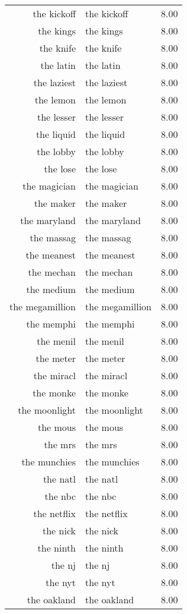 \begin{table}[ht]
\begin{tabular}{rlr}
  the kickoff & the kickoff & 8.00 \\ 
  the kings & the kings & 8.00 \\ 
  the knife & the knife & 8.00 \\ 
  the latin & the latin & 8.00 \\ 
  the laziest & the laziest & 8.00 \\ 
  the lemon & the lemon & 8.00 \\ 
  the lesser & the lesser & 8.00 \\ 
  the liquid & the liquid & 8.00 \\ 
  the lobby & the lobby & 8.00 \\ 
  the lose & the lose & 8.00 \\ 
  the magician & the magician & 8.00 \\ 
  the maker & the maker & 8.00 \\ 
  the maryland & the maryland & 8.00 \\ 
  the massag & the massag & 8.00 \\ 
  the meanest & the meanest & 8.00 \\ 
  the mechan & the mechan & 8.00 \\ 
  the medium & the medium & 8.00 \\ 
  the megamillion & the megamillion & 8.00 \\ 
  the memphi & the memphi & 8.00 \\ 
  the menil & the menil & 8.00 \\ 
  the meter & the meter & 8.00 \\ 
  the miracl & the miracl & 8.00 \\ 
  the monke & the monke & 8.00 \\ 
  the moonlight & the moonlight & 8.00 \\ 
  the mous & the mous & 8.00 \\ 
  the mrs & the mrs & 8.00 \\ 
  the munchies & the munchies & 8.00 \\ 
  the natl & the natl & 8.00 \\ 
  the nbc & the nbc & 8.00 \\ 
  the netflix & the netflix & 8.00 \\ 
  the nick & the nick & 8.00 \\ 
  the ninth & the ninth & 8.00 \\ 
  the nj & the nj & 8.00 \\ 
  the nyt & the nyt & 8.00 \\ 
  the oakland & the oakland & 8.00 \\ 

\end{tabular}
\end{table}
